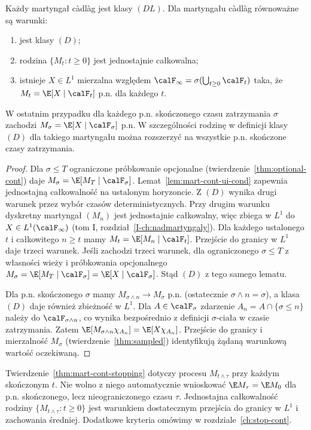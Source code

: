 \begin{twierdzenie}
\label{thm:mart-cont-class-d}
Każdy martyngał c\`adl\`ag jest klasy $(DL)$.
Dla martyngału c\`adl\`ag równoważne są warunki:
\begin{enumerate}
\item jest klasy $(D)$;
\item rodzina $\{M_t:t\ge0\}$ jest jednostajnie całkowalna;
\item istnieje $X\in L^1$ mierzalna względem
$\calF_\infty=\sigma(\bigcup_{t\ge0}\calF_t)$
taka, że $M_t=\E[X\mid\calF_t]$ p.n. dla każdego $t$.
\end{enumerate}
W ostatnim przypadku dla każdego p.n. skończonego
czasu zatrzymania $\sigma$ zachodzi
$M_\sigma=\E[X\mid\calF_\sigma]$ p.n.
W szczególności rodzinę w definicji klasy $(D)$
dla takiego martyngału można rozszerzyć na
wszystkie p.n. skończone czasy zatrzymania.
\end{twierdzenie}
\begin{proof}
Dla $\sigma\le T$ ograniczone próbkowanie
opcjonalne (twierdzenie~\ref{thm:optional-cont})
daje $M_\sigma=\E[M_T\mid\calF_\sigma]$.
Lemat~\ref{lem:mart-cont-ui-cond} zapewnia
jednostajną całkowalność na ustalonym horyzoncie.
Z $(D)$ wynika drugi warunek przez wybór czasów
deterministycznych.
Przy drugim warunku dyskretny martyngał $(M_n)$
jest jednostajnie całkowalny, więc zbiega w $L^1$
do $X\in L^1(\calF_\infty)$
(tom I, rozdział~\ref{I-ch:nadmartyngaly}).
Dla każdego ustalonego $t$ i całkowitego $n\ge t$
mamy $M_t=\E[M_n\mid\calF_t]$.
Przejście do granicy w $L^1$ daje trzeci warunek.
Jeśli zachodzi trzeci warunek, dla ograniczonego
$\sigma\le T$ z własności wieży i próbkowania
opcjonalnego
$M_\sigma=\E[M_T\mid\calF_\sigma]
=\E[X\mid\calF_\sigma]$.
Stąd $(D)$ z tego samego lematu.

Dla p.n. skończonego $\sigma$ mamy
$M_{\sigma\wedge n}\to M_\sigma$ p.n.
(ostatecznie $\sigma\wedge n=\sigma$),
a klasa $(D)$ daje również zbieżność w $L^1$.
Dla $A\in\calF_\sigma$ zdarzenie
$A_n=A\cap\{\sigma\le n\}$ należy do
$\calF_{\sigma\wedge n}$, co wynika bezpośrednio
z definicji $\sigma$-ciała w czasie zatrzymania.
Zatem
$\E[M_{\sigma\wedge n}\chi_{A_n}]=\E[X\chi_{A_n}]$.
Przejście do granicy i mierzalność $M_\sigma$
(twierdzenie~\ref{thm:sampled}) identyfikują
żądaną warunkową wartość oczekiwaną.
\end{proof}

\begin{uwaga}
Twierdzenie~\ref{thm:mart-cont-stopping}
dotyczy procesu $M_{t\wedge\tau}$ przy każdym
skończonym $t$. Nie wolno z niego automatycznie
wnioskować $\E M_\tau=\E M_0$ dla p.n. skończonego,
lecz nieograniczonego czasu $\tau$.
Jednostajna całkowalność rodziny
$\{M_{t\wedge\tau}:t\ge0\}$ jest warunkiem
dostatecznym przejścia do granicy w $L^1$
i zachowania średniej. Dodatkowe kryteria
omówimy w rozdziale~\ref{ch:stop-cont}.
\end{uwaga}

